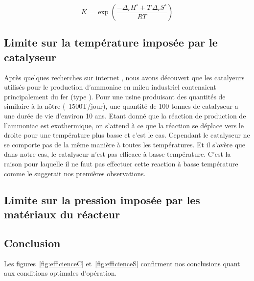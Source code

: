 \[
K = \exp{\left( \frac{- \Delta_r H^{\circ} + T \, \Delta_r S^{\circ}}{R T}\right)}
\]

\subsection{Limite sur la température imposée par le catalyseur}

Après quelques recherches sur internet \cite{catalyseur}, nous avons découvert que les catalyeurs utilisés
pour le production d'ammoniac en mileu industriel contenaient principalement du fer (type ). 
Pour une usine produisant des quantités de  similaire à la nôtre (~1500T/jour), une quantité de 100 tonnes
de catalyseur a une durée de vie d'environ 10 ans. Etant donné que la réaction de production de l'ammoniac est
exothermique, on s'attend à ce que la réaction se déplace vers le droite pour une température plus basse et c'est le cas.
Cependant le catalyseur ne se comporte pas de la m\^eme manière à toutes les températures. Et il s'avère que dans notre
cas, le catalyseur n'est pas efficace à basse température. C'est la raison pour laquelle il ne faut pas effectuer
cette reaction à basse température comme le suggerait nos premières observations.

\subsection{Limite sur la pression imposée par les matériaux du réacteur}

\subsection{Conclusion}

Les figures~\ref{fig:efficienceC} et~\ref{fig:efficienceS} confirment 
nos conclusions quant aux conditions optimales d'opération.

